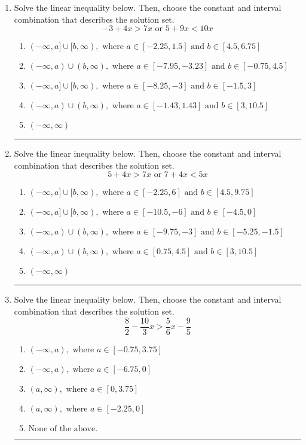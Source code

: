 \documentclass[14pt]{extbook}
\newcommand{\litem}[1]{\item#1\hspace*{-1cm}\rule{\textwidth}{0.4pt}}
\begin{document}
\begin{enumerate}
{\begin{enumerate}[label=\Alph*.]
\end{enumerate} }
\litem{
Solve the linear inequality below. Then, choose the constant and interval combination that describes the solution set.\[ -3 + 4 x > 7 x \text{ or } 5 + 9 x < 10 x \]\begin{enumerate}[label=\Alph*.]
\item \( (-\infty, a] \cup [b, \infty), \text{ where } a \in [-2.25, 1.5] \text{ and } b \in [4.5, 6.75] \)
\item \( (-\infty, a) \cup (b, \infty), \text{ where } a \in [-7.95, -3.23] \text{ and } b \in [-0.75, 4.5] \)
\item \( (-\infty, a] \cup [b, \infty), \text{ where } a \in [-8.25, -3] \text{ and } b \in [-1.5, 3] \)
\item \( (-\infty, a) \cup (b, \infty), \text{ where } a \in [-1.43, 1.43] \text{ and } b \in [3, 10.5] \)
\item \( (-\infty, \infty) \)

\end{enumerate} }
\litem{
Solve the linear inequality below. Then, choose the constant and interval combination that describes the solution set.\[ 5 + 4 x > 7 x \text{ or } 7 + 4 x < 5 x \]\begin{enumerate}[label=\Alph*.]
\item \( (-\infty, a] \cup [b, \infty), \text{ where } a \in [-2.25, 6] \text{ and } b \in [4.5, 9.75] \)
\item \( (-\infty, a] \cup [b, \infty), \text{ where } a \in [-10.5, -6] \text{ and } b \in [-4.5, 0] \)
\item \( (-\infty, a) \cup (b, \infty), \text{ where } a \in [-9.75, -3] \text{ and } b \in [-5.25, -1.5] \)
\item \( (-\infty, a) \cup (b, \infty), \text{ where } a \in [0.75, 4.5] \text{ and } b \in [3, 10.5] \)
\item \( (-\infty, \infty) \)

\end{enumerate} }
\litem{
Solve the linear inequality below. Then, choose the constant and interval combination that describes the solution set.\[ \frac{8}{2} - \frac{10}{3} x > \frac{5}{6} x - \frac{9}{5} \]\begin{enumerate}[label=\Alph*.]
\item \( (-\infty, a), \text{ where } a \in [-0.75, 3.75] \)
\item \( (-\infty, a), \text{ where } a \in [-6.75, 0] \)
\item \( (a, \infty), \text{ where } a \in [0, 3.75] \)
\item \( (a, \infty), \text{ where } a \in [-2.25, 0] \)
\item \( \text{None of the above}. \)


\end{enumerate}}
\end{enumerate}
\end{document}
